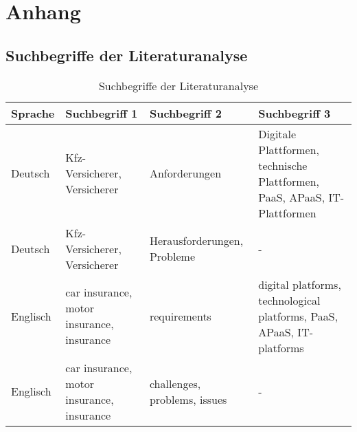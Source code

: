 \chapter{Anhang}\label{anhang}



\section{Suchbegriffe der Literaturanalyse}
\begin{table}[ht]
    \begin{center}
    \begin{tabular}{|p{3cm}|p{3cm}|p{}|p{}|}
        \hline Sprache & Suchbegriff 1 & Suchbegriff 2 & Suchbegriff 3\\[0.5ex]
        \hline Deutsch & Kfz-Versicherer, Versicherer & Anforderungen & Digitale Plattformen, technische Plattformen, PaaS, APaaS, IT-Plattformen\\
        \hline Deutsch & Kfz-Versicherer, Versicherer & Herausforderungen, Probleme & -\\
        \hline Englisch & car insurance, motor insurance, insurance & requirements & digital platforms, technological platforms, PaaS, APaaS, IT-platforms\\
        \hline Englisch & car insurance, motor insurance, insurance & challenges, problems, issues & -\\
        \hline
    \end{tabular}
    \end{center}
    \caption{Suchbegriffe der Literaturanalyse}
    \label{tab:suchbegriffe}
\end{table}  

\newpage
